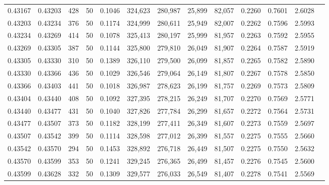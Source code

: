 \begin{tabular}{rrrrrrrrrrrrr}
0.43167 & 0.43203 &   428 &  50 &                                     0.1046 & 324,623 & 280,987 &  25,899 &  82,057 & 0.2260 & 0.7601 & 2.6028 \\
0.43203 & 0.43234 &   376 &  50 &                                     0.1174 & 324,999 & 280,611 &  25,949 &  82,007 & 0.2262 & 0.7596 & 2.5993 \\
0.43234 & 0.43269 &   414 &  50 &                                     0.1078 & 325,413 & 280,197 &  25,999 &  81,957 & 0.2263 & 0.7592 & 2.5955 \\
0.43269 & 0.43305 &   387 &  50 &                                     0.1144 & 325,800 & 279,810 &  26,049 &  81,907 & 0.2264 & 0.7587 & 2.5919 \\
0.43305 & 0.43330 &   310 &  50 &                                     0.1389 & 326,110 & 279,500 &  26,099 &  81,857 & 0.2265 & 0.7582 & 2.5890 \\
0.43330 & 0.43366 &   436 &  50 &                                     0.1029 & 326,546 & 279,064 &  26,149 &  81,807 & 0.2267 & 0.7578 & 2.5850 \\
0.43366 & 0.43403 &   441 &  50 &                                     0.1018 & 326,987 & 278,623 &  26,199 &  81,757 & 0.2269 & 0.7573 & 2.5809 \\
0.43404 & 0.43440 &   408 &  50 &                                     0.1092 & 327,395 & 278,215 &  26,249 &  81,707 & 0.2270 & 0.7569 & 2.5771 \\
0.43440 & 0.43477 &   431 &  50 &                                     0.1040 & 327,826 & 277,784 &  26,299 &  81,657 & 0.2272 & 0.7564 & 2.5731 \\
0.43477 & 0.43507 &   373 &  50 &                                     0.1182 & 328,199 & 277,411 &  26,349 &  81,607 & 0.2273 & 0.7559 & 2.5697 \\
0.43507 & 0.43542 &   399 &  50 &                                     0.1114 & 328,598 & 277,012 &  26,399 &  81,557 & 0.2275 & 0.7555 & 2.5660 \\
0.43542 & 0.43570 &   294 &  50 &                                     0.1453 & 328,892 & 276,718 &  26,449 &  81,507 & 0.2275 & 0.7550 & 2.5632 \\
0.43570 & 0.43599 &   353 &  50 &                                     0.1241 & 329,245 & 276,365 &  26,499 &  81,457 & 0.2276 & 0.7545 & 2.5600 \\
0.43599 & 0.43628 &   332 &  50 &                                     0.1309 & 329,577 & 276,033 &  26,549 &  81,407 & 0.2278 & 0.7541 & 2.5569 \\

\end{tabular}
